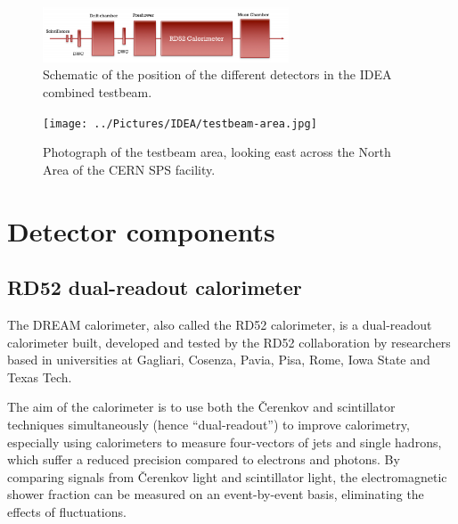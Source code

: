 \begin{figure}[hp]
	\centering
	\includegraphics[width=0.65\textwidth]{../Pictures/IDEA/IDEA-testbeam-setup.png}
	\caption{Schematic of the position of the different detectors in the \acrshort{IDEA} combined testbeam.}
	\label{figure:idea/testbeam-layout}
\end{figure}

\begin{figure}[hp]
	\centering
	\texttt{[image: ../Pictures/IDEA/testbeam-area.jpg]}
	\caption{Photograph of the testbeam area, looking east across the North Area of the \acrshort{CERN} \acrshort{SPS} facility.}
	\label{figure:idea/testbeam-photo}
\end{figure}

\section{Detector components}

\subsection{RD52 dual-readout calorimeter} %
The \acrfull{DREAM} calorimeter, also called the RD52 calorimeter, is a dual-readout calorimeter built, developed and tested by the RD52 collaboration by researchers based in universities at Gagliari, Cosenza, Pavia, Pisa, Rome, Iowa State and Texas Tech. 

The aim of the calorimeter is to use both the \v{C}erenkov and scintillator techniques simultaneously (hence ``dual-readout'') to improve calorimetry, especially using calorimeters to measure four-vectors of jets and single hadrons, which suffer a reduced precision compared to electrons and photons. By comparing signals from \v{C}erenkov light and scintillator light, the electromagnetic shower fraction can be measured on an event-by-event basis, eliminating the effects of fluctuations. %


